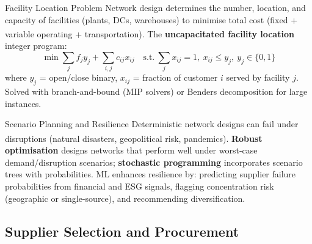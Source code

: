 \begin{v3topic}{Facility Location Problem}
    Network design determines the number, location, and capacity of facilities (plants, DCs, warehouses) to minimise total cost (fixed + variable operating + transportation)\textsuperscript{\cite[][pp.~146--160]{chopraSupplyChainManagement2019}}.
    The \textbf{uncapacitated facility location} integer program:
    \begin{equation}
        \min \sum_j f_j y_j + \sum_{i,j} c_{ij} x_{ij}
        \quad \text{s.t.}\ \sum_j x_{ij}=1,\ x_{ij}\le y_j,\ y_j\in\{0,1\}
    \end{equation}
    where $y_j$ = open/close binary, $x_{ij}$ = fraction of customer $i$ served by facility $j$.
    Solved with branch-and-bound (MIP solvers) or Benders decomposition for large instances.

\end{v3topic}
\begin{v3topic}{Scenario Planning and Resilience}
    Deterministic network designs can fail under disruptions (natural disasters, geopolitical risk, pandemics)\textsuperscript{\cite[][pp.~600--605]{chopraSupplyChainManagement2019}}.
    \textbf{Robust optimisation} designs networks that perform well under worst-case demand/disruption scenarios; \textbf{stochastic programming} incorporates scenario trees with probabilities.
    ML enhances resilience by: predicting supplier failure probabilities from financial and ESG signals, flagging concentration risk (geographic or single-source), and recommending diversification.

\end{v3topic}

\subsection{Supplier Selection and Procurement}



